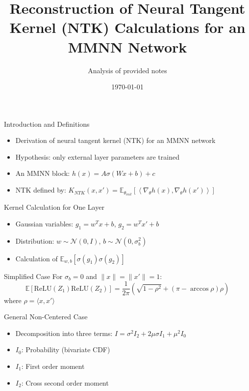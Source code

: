 \documentclass{beamer}
\title{Reconstruction of Neural Tangent Kernel (NTK) Calculations for an MMNN Network}
\author{Analysis of provided notes}
\date{\today}
\begin{document}
\begin{frame}
\titlepage
\end{frame}

\begin{frame}{Introduction and Definitions}
\begin{itemize}
\item Derivation of neural tangent kernel (NTK) for an MMNN network
\item Hypothesis: only external layer parameters are trained
\item An MMNN block: $h(x) = A\sigma(Wx+b) + c$
\item NTK defined by: $K_{NTK}(x, x') = \mathbb{E}_{\theta_{init}} \left[ \left\langle \nabla_{\theta} h(x), \nabla_{\theta} h(x') \right\rangle \right]$
\end{itemize}
\end{frame}

\begin{frame}{Kernel Calculation for One Layer}
\begin{itemize}
\item Gaussian variables: $g_1 = w^T x + b$, $g_2 = w^T x' + b$
\item Distribution: $w \sim \mathcal{N}(0, I)$, $b \sim \mathcal{N}(0, \sigma_b^2)$
\item Calculation of $\mathbb{E}_{w,b} [\sigma(g_1) \sigma(g_2)]$
\end{itemize}
\end{frame}

\begin{frame}{Simplified Case}
For $\sigma_b=0$ and $\|x\|=\|x'\|=1$:
\begin{equation}
\mathbb{E}[\text{ReLU}(Z_1)\text{ReLU}(Z_2)] = \frac{1}{2\pi} (\sqrt{1-\rho^2} + (\pi - \arccos\rho)\rho)
\end{equation}
where $\rho = \langle x, x' \rangle$
\end{frame}

\begin{frame}{General Non-Centered Case}
\begin{itemize}
\item Decomposition into three terms: $I = \sigma^2 I_2 + 2\mu\sigma I_1 + \mu^2 I_0$
\item $I_0$: Probability (bivariate CDF)
\item $I_1$: First order moment
\item $I_2$: Cross second order moment
\end{itemize}
\end{frame}
\end{document}
